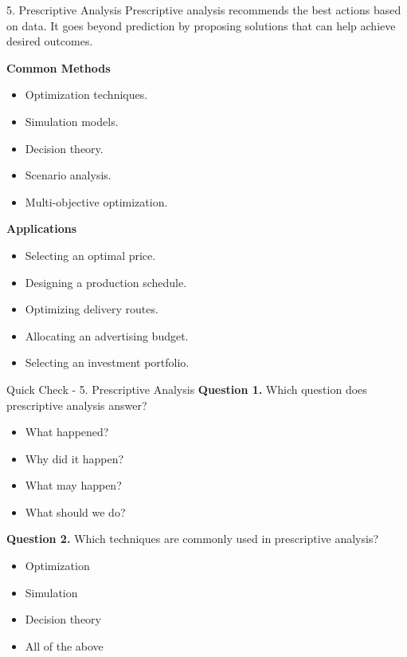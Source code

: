 \documentclass[aspectratio=169,11pt]{beamer}
\begin{document}
\begin{frame}[allowframebreaks]{5. Prescriptive Analysis}
\small
Prescriptive analysis recommends the best actions based on data. It goes beyond prediction by proposing solutions that can help achieve desired outcomes.\par\medskip
\textbf{Common Methods}\par\medskip
\begin{itemize}
\item Optimization techniques.
\item Simulation models.
\item Decision theory.
\item Scenario analysis.
\item Multi-objective optimization.
\end{itemize}
\textbf{Applications}\par\medskip
\begin{itemize}
\item Selecting an optimal price.
\item Designing a production schedule.
\item Optimizing delivery routes.
\item Allocating an advertising budget.
\item Selecting an investment portfolio.
\end{itemize}
\end{frame}
\begin{frame}[allowframebreaks]{Quick Check - 5. Prescriptive Analysis}
\footnotesize
\textbf{Question 1.} Which question does prescriptive analysis answer?\par\medskip
\begin{itemize}
\item[\textbf{A.}] What happened?
\item[\textbf{B.}] Why did it happen?
\item[\textbf{C.}] What may happen?
\item[\textbf{D.}] What should we do?
\end{itemize}
\textbf{Question 2.} Which techniques are commonly used in prescriptive analysis?\par\medskip
\begin{itemize}
\item[\textbf{A.}] Optimization
\item[\textbf{B.}] Simulation
\item[\textbf{C.}] Decision theory
\item[\textbf{D.}] All of the above
\end{itemize}
\end{frame}
\end{document}
